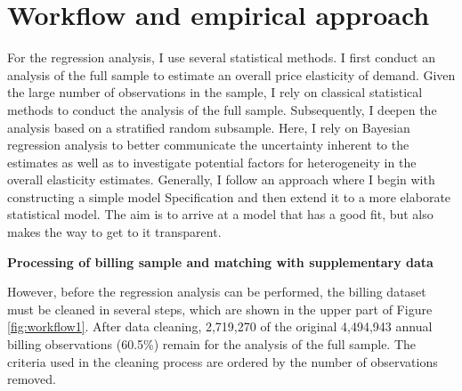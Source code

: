 \documentclass[12pt,twoside]{reedthesis}
\begin{document}
\hypertarget{workflow-empirical-approach}{%
\section{Workflow and empirical approach}\label{workflow-empirical-approach}}

For the regression analysis, I use several statistical methods. I first conduct an analysis of the full sample to estimate an overall price elasticity of demand. Given the large number of observations in the sample, I rely on classical statistical methods to conduct the analysis of the full sample. Subsequently, I deepen the analysis based on a stratified random subsample. Here, I rely on Bayesian regression analysis to better communicate the uncertainty inherent to the estimates as well as to investigate potential factors for heterogeneity in the overall elasticity estimates. Generally, I follow an approach where I begin with constructing a simple model Specification and then extend it to a more elaborate statistical model. The aim is to arrive at a model that has a good fit, but also makes the way to get to it transparent.

\textbf{Processing of billing sample and matching with supplementary data}

However, before the regression analysis can be performed, the billing dataset must be cleaned in several steps, which are shown in the upper part of Figure \ref{fig:workflow1}. After data cleaning, 2,719,270 of the original 4,494,943 annual billing observations (60.5\%) remain for the analysis of the full sample. The criteria used in the cleaning process are ordered by the number of observations removed.
\end{document}
